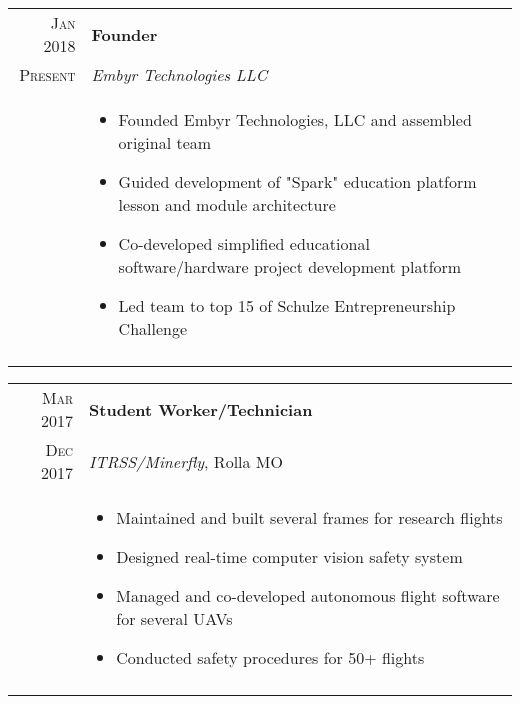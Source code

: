 \documentclass[a4paper,10pt]{article}
\newcommand{\br}{\\\multicolumn{2}{c}{}}
\begin{document}
\begin{tabular}{r|p{15cm}}
    \textsc{Jan 2018} & \textbf{Founder} \\
    \textsc{Present}  & \textit{Embyr Technologies LLC} \\ &
    \begin{itemize}
    \item Founded Embyr Technologies, LLC and assembled original team
    \item Guided development of "Spark" education platform lesson and module architecture
    \item Co-developed simplified educational software/hardware project development platform
    \item Led team to top 15 of Schulze Entrepreneurship Challenge

    \end{itemize} \br\\

\end{tabular}

\begin{tabular}{r|p{15cm}}
    \textsc{Mar 2017} & \textbf{Student Worker/Technician} \\
    \textsc{Dec 2017} & \textit{ITRSS/Minerfly}, Rolla MO \\ &
    \begin{itemize}
    \item Maintained and built several frames for research flights
    \item Designed real-time computer vision safety system
    \item Managed and co-developed autonomous flight software for several UAVs
    \item Conducted safety procedures for 50+ flights

    \end{itemize} \br\\

\end{tabular}
\end{document}
